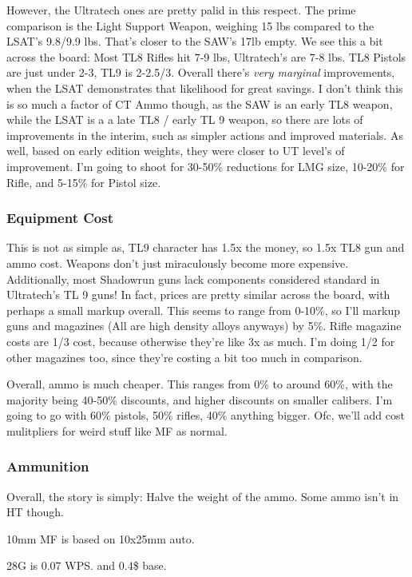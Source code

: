 \begin{multicols*}{2}
	 However, the Ultratech ones are pretty palid in this respect. The prime comparison is the Light Support Weapon, weighing 15 lbs compared to the LSAT's 9.8/9.9 lbs. That's closer to the SAW's 17lb empty. We see this a bit across the board: Most TL8 Rifles hit 7-9 lbs, Ultratech's are 7-8 lbs. TL8 Pistols are just under 2-3, TL9 is 2-2.5/3. Overall there's \textit{very marginal} improvements, when the LSAT demonstrates that likelihood for great savings. I don't think this is so much a factor of CT Ammo though,  as the SAW is an early TL8 weapon, while the LSAT is a a late TL8 / early TL 9 weapon, so there are lots of improvements in the interim, such as simpler actions and improved materials. As well, based on early edition weights, they were closer to UT level's of improvement.  I'm going to shoot for 30-50\% reductions for LMG size, 10-20\% for Rifle, and 5-15\% for Pistol size.
	 
	 \subsubsection{Equipment Cost}
	 
	 This is not as simple as, TL9 character has 1.5x the money, so 1.5x TL8 gun and ammo cost. Weapons don't just miraculously become more expensive. Additionally, most Shadowrun guns lack components considered standard in Ultratech's TL 9 guns! In fact, prices are pretty similar across the board, with perhaps a small markup overall. This seems to range from 0-10\%, so I'll markup guns and magazines (All are high density alloys anyways) by 5\%. Rifle magazine costs are 1/3 cost, because otherwise they're like 3x as much. I'm doing 1/2 for other magazines too, since they're costing a bit too much in comparison.
	 
	 Overall, ammo is much cheaper. This ranges from 0\% to around 60\%, with the majority being 40-50\% discounts, and higher discounts on smaller calibers. I'm going to go with 60\% pistols, 50\% rifles, 40\% anything bigger. Ofc, we'll add cost mulitpliers for weird stuff like MF as normal.
	 
	 \subsubsection{Ammunition}
	 Overall, the story is simply: Halve the weight of the ammo. Some ammo isn't in HT though. 
	 
	 10mm MF is based on 10x25mm auto.
	 
	 28G is 0.07  WPS. and 0.4\$ base.
	 

\end{multicols*}
